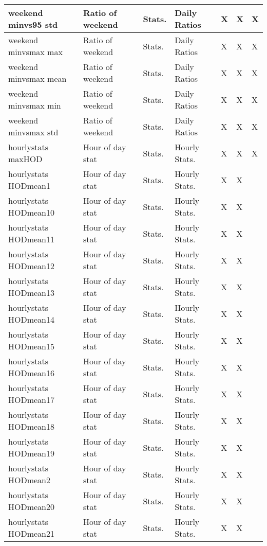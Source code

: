 {{\begin{longtable}[l]{ | p{4cm} | p{4cm} | p{1cm} | p{2cm} | p{0.3cm} | p{0.3cm} | p{0.3cm} |}
	 weekend minvs95 std & Ratio of weekend  & Stats. & Daily Ratios & X & X & X \\ \hline
	 weekend minvsmax max & Ratio of weekend  & Stats. & Daily Ratios & X & X & X \\ \hline
	 weekend minvsmax mean & Ratio of weekend  & Stats. & Daily Ratios & X & X & X \\ \hline
	 weekend minvsmax min & Ratio of weekend  & Stats. & Daily Ratios & X & X & X \\ \hline
	 weekend minvsmax std & Ratio of weekend  & Stats. & Daily Ratios & X & X & X \\ \hline
	 hourlystats maxHOD & Hour of day stat & Stats. & Hourly Stats. & X & X & X \\ \hline
	 hourlystats HODmean1 & Hour of day stat & Stats. & Hourly Stats. & X & X & \  \\ \hline
	 hourlystats HODmean10 & Hour of day stat & Stats. & Hourly Stats. & X & X & \  \\ \hline
	 hourlystats HODmean11 & Hour of day stat & Stats. & Hourly Stats. & X & X & \  \\ \hline
	 hourlystats HODmean12 & Hour of day stat & Stats. & Hourly Stats. & X & X & \  \\ \hline
	 hourlystats HODmean13 & Hour of day stat & Stats. & Hourly Stats. & X & X & \  \\ \hline
	 hourlystats HODmean14 & Hour of day stat & Stats. & Hourly Stats. & X & X & \  \\ \hline
	 hourlystats HODmean15 & Hour of day stat & Stats. & Hourly Stats. & X & X & \  \\ \hline
	 hourlystats HODmean16 & Hour of day stat & Stats. & Hourly Stats. & X & X & \  \\ \hline
	 hourlystats HODmean17 & Hour of day stat & Stats. & Hourly Stats. & X & X & \  \\ \hline
	 hourlystats HODmean18 & Hour of day stat & Stats. & Hourly Stats. & X & X & \  \\ \hline
	 hourlystats HODmean19 & Hour of day stat & Stats. & Hourly Stats. & X & X & \  \\ \hline
	 hourlystats HODmean2 & Hour of day stat & Stats. & Hourly Stats. & X & X & \  \\ \hline
	 hourlystats HODmean20 & Hour of day stat & Stats. & Hourly Stats. & X & X & \  \\ \hline
	 hourlystats HODmean21 & Hour of day stat & Stats. & Hourly Stats. & X & X & \  \\ \hline

\end{longtable}}}
